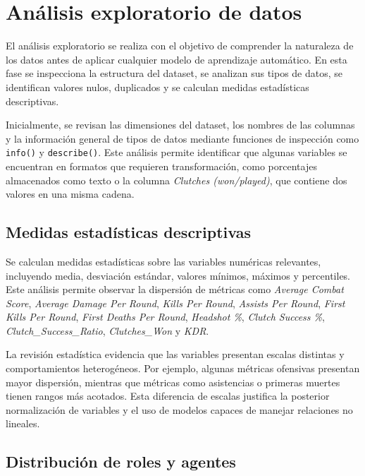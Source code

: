 \documentclass{ULBreport} %
\begin{document}
\section{Análisis exploratorio de datos}

El análisis exploratorio se realiza con el objetivo de comprender la naturaleza de los datos antes de aplicar cualquier modelo de aprendizaje automático. En esta fase se inspecciona la estructura del dataset, se analizan sus tipos de datos, se identifican valores nulos, duplicados y se calculan medidas estadísticas descriptivas.

Inicialmente, se revisan las dimensiones del dataset, los nombres de las columnas y la información general de tipos de datos mediante funciones de inspección como \texttt{info()} y \texttt{describe()}. Este análisis permite identificar que algunas variables se encuentran en formatos que requieren transformación, como porcentajes almacenados como texto o la columna \textit{Clutches (won/played)}, que contiene dos valores en una misma cadena.

\subsection{Medidas estadísticas descriptivas}

Se calculan medidas estadísticas sobre las variables numéricas relevantes, incluyendo media, desviación estándar, valores mínimos, máximos y percentiles. Este análisis permite observar la dispersión de métricas como \textit{Average Combat Score}, \textit{Average Damage Per Round}, \textit{Kills Per Round}, \textit{Assists Per Round}, \textit{First Kills Per Round}, \textit{First Deaths Per Round}, \textit{Headshot \%}, \textit{Clutch Success \%}, \textit{Clutch\_Success\_Ratio}, \textit{Clutches\_Won} y \textit{KDR}.

La revisión estadística evidencia que las variables presentan escalas distintas y comportamientos heterogéneos. Por ejemplo, algunas métricas ofensivas presentan mayor dispersión, mientras que métricas como asistencias o primeras muertes tienen rangos más acotados. Esta diferencia de escalas justifica la posterior normalización de variables y el uso de modelos capaces de manejar relaciones no lineales.

\subsection{Distribución de roles y agentes}
\end{document}
